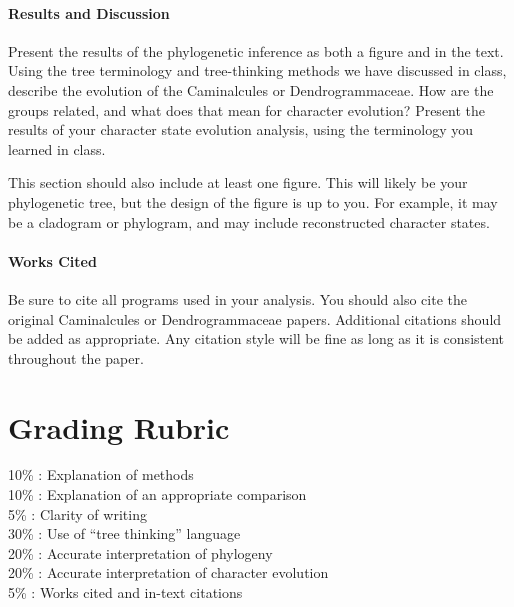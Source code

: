 \documentclass[12pt]{article}
\begin{document}
\paragraph{Results and Discussion}
Present the results of the phylogenetic inference as both a figure and in the text.
Using the tree terminology and tree-thinking methods we have discussed in class, describe the evolution of the Caminalcules or Dendrogrammaceae.
How are the groups related, and what does that mean for character evolution?
Present the results of your character state evolution analysis, using the terminology you learned in class.

This section should also include at least one figure.
This will likely be your phylogenetic tree, but the design of the figure is up to you. 
For example, it may be a cladogram or phylogram, and may include reconstructed character states.

\paragraph{Works Cited}
Be sure to cite all programs used in your analysis. 
You should also cite the original Caminalcules or Dendrogrammaceae papers.
Additional citations should be added as appropriate. 
Any citation style will be fine as long as it is consistent throughout the paper.


\section{Grading Rubric}

10\% : Explanation of methods\\
10\% : Explanation of an appropriate comparison\\
5\% : Clarity of writing\\
30\% : Use of ``tree thinking'' language\\
20\% : Accurate interpretation of phylogeny\\
20\% : Accurate interpretation of character evolution\\
5\% : Works cited and in-text citations\\
\end{document}
